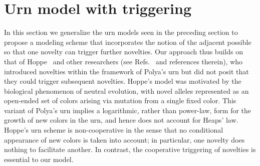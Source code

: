 \documentclass[graybox]{svmult}
\begin{document}
\section{Urn model with triggering}
\label{sec:vittorio_polya_urns}
In this section we generalize the urn models seen in the preceding section to propose a modeling scheme that incorporates the notion of the adjacent possible so that one novelty can trigger further novelties. Our approach thus builds on that of Hoppe~\cite{Hoppe_1984} and other researchers (see Refs.~\cite{Kotz_1996, Alexander_2012} and references therein), who introduced novelties within the framework of Polya's urn but did not posit that they could trigger subsequent novelties.  Hoppe's model was motivated by the biological phenomenon of neutral evolution, with novel alleles represented as an open-ended set of colors arising via mutation from a single fixed color. This variant of Polya's urn implies a logarithmic, rather than power-law, form for the growth of new colors in the urn, and hence does not account for Heaps' law. Hoppe's urn scheme is non-cooperative in the sense that no conditional appearance of new colors is taken into account; in particular, one novelty does nothing to facilitate another. In 
contrast, the cooperative triggering of novelties is essential to our model.
\end{document}
